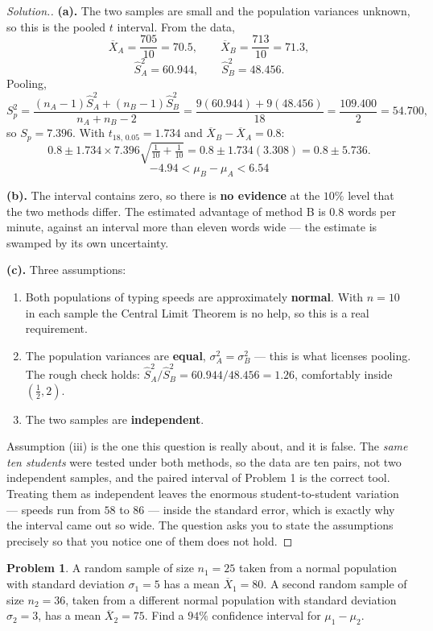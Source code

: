 \documentclass[11pt,a4paper]{article}
\theoremstyle{definition}
\newtheorem{problemx}{Problem}[section]
\newenvironment{problem}{\begin{problemx}}{\end{problemx}}
\newenvironment{solution}
  {\renewcommand{\qedsymbol}{}\begin{proof}[\textit{Solution}.]}
  {\end{proof}}
\begin{document}
\begin{solution}
\textbf{(a).} The two samples are small and the population variances unknown, so this is the
pooled $t$ interval. From the data,
\[\overline{X}_A=\frac{705}{10}=70.5,\qquad \overline{X}_B=\frac{713}{10}=71.3,\]
\[\hat{S}_A^2=60.944,\qquad \hat{S}_B^2=48.456.\]
Pooling,
\[S_p^2=\frac{(n_A-1)\hat{S}_A^2+(n_B-1)\hat{S}_B^2}{n_A+n_B-2}
=\frac{9(60.944)+9(48.456)}{18}=\frac{109.400}{2}=54.700,\]
so $S_p=7.396$. With $t_{18,\,0.05}=1.734$ and $\overline{X}_B-\overline{X}_A=0.8$:
\[0.8\pm 1.734\times 7.396\sqrt{\tfrac{1}{10}+\tfrac{1}{10}}
=0.8\pm 1.734(3.308)=0.8\pm 5.736.\]
\[-4.94<\mu_B-\mu_A<6.54\]

\textbf{(b).} The interval contains zero, so there is \textbf{no evidence} at the $10\%$
level that the two methods differ. The estimated advantage of method B is $0.8$ words per
minute, against an interval more than eleven words wide --- the estimate is swamped by its
own uncertainty.

\textbf{(c).} Three assumptions:
\begin{enumerate}
\item[(i).] Both populations of typing speeds are approximately \textbf{normal}. With
$n=10$ in each sample the Central Limit Theorem is no help, so this is a real requirement.
\item[(ii).] The population variances are \textbf{equal}, $\sigma_A^2=\sigma_B^2$ --- this is
what licenses pooling. The rough check holds: $\hat{S}_A^2/\hat{S}_B^2=60.944/48.456=1.26$,
comfortably inside $(\frac{1}{2},2)$.
\item[(iii).] The two samples are \textbf{independent}.
\end{enumerate}

Assumption (iii) is the one this question is really about, and it is false. The \emph{same
ten students} were tested under both methods, so the data are ten pairs, not two independent
samples, and the paired interval of Problem 1 is the correct tool. Treating them as
independent leaves the enormous student-to-student variation --- speeds run from $58$ to
$86$ --- inside the standard error, which is exactly why the interval came out so wide.
The question asks you to state the assumptions precisely so that you notice one of them
does not hold.
\end{solution}

\begin{problem}
A random sample of size $n_1=25$ taken from a normal population with standard deviation
$\sigma_1=5$ has a mean $\overline{X}_1=80$. A second random sample of size $n_2=36$, taken
from a different normal population with standard deviation $\sigma_2=3$, has a mean
$\overline{X}_2=75$. Find a $94\%$ confidence interval for $\mu_1-\mu_2$.
\end{problem}
\end{document}
